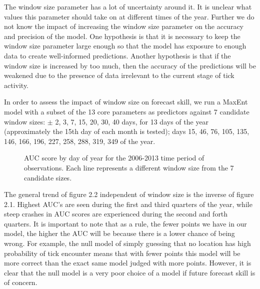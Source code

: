 \noindent The window size parameter has a lot of uncertainty around it. It is unclear what values this parameter should take on at different times of the year. Further we do not know the impact of increasing the window size parameter on the accuracy and precision of the model. One hypothesis is that it is necessary to keep the window size parameter large enough so that the model has exposure to enough data to create well-informed predictions. Another hypothesis is that if the window size is increased by too much, then the accuracy of the predictions will be weakened due to the presence of data irrelevant to the current stage of tick activity. \newline

\noindent In order to assess the impact of window size on forecast skill, we run a MaxEnt model with a subset of the 13 core parameters as predictors against 7 candidate window sizes: $\pm$ 2, 3, 7, 15, 20, 30, 40 days, for 13 days of the year (approximately the 15th day of each month is tested); days 15, 46, 76, 105, 135, 146, 166, 196, 227, 258, 288, 319, 349 of the year. \newline

\begin{figure} [!ht]
\centerline{}
\caption{AUC score by day of year for the 2006-2013 time period of observations. Each line represents a different window size from the 7 candidate sizes. }
\label{fig6}
\end{figure}

\noindent The general trend of figure 2.2 independent of window size is the inverse of figure 2.1. Highest AUC's are seen during the first and third quarters of the year, while steep crashes in AUC scores are experienced during the second and forth quarters. It is important to note that as a rule, the fewer points we have in our model, the higher the AUC will be because there is a lower chance of being wrong. For example, the null model of simply guessing that no location has high probability of tick encounter means that with fewer points this model will be more correct than the exact same model judged with more points. However, it is clear that the null model is a very poor choice of a model if future forecast skill is of concern. \newline

